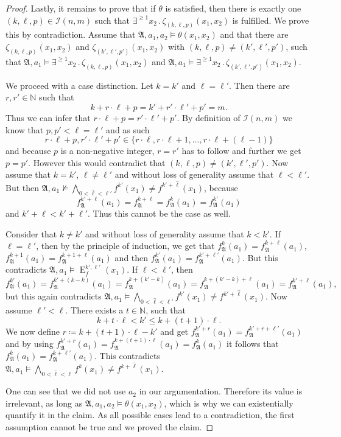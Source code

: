 \begin{proof}
	Lastly, it remains to prove that if $\theta$ is satisfied, then there is exactly one $(k,\ell,p)\in\mathcal{I}(n,m)$ such that $\exists^{\geq 1}x_2\operatorname{.}\zeta_{(k,\ell,p)}(x_1, x_2)$ is fulfilled.
	We prove this by contradiction.
	Assume that $\mathfrak A,a_1,a_2\models \theta(x_1,x_2)$ and that there are $\zeta_{(k,\ell,p)}(x_1,x_2)$ and $\zeta_{(k',\ell',p')}(x_1,x_2)$ with $(k,\ell,p)\neq (k',\ell',p')$, such that $\mathfrak A,a_1\models \exists^{\geq 1}x_2\operatorname{.}\zeta_{(k,\ell,p)}(x_1,x_2)$ and $\mathfrak A,a_1\models \exists^{\geq 1}x_2\operatorname{.}\zeta_{(k',\ell',p')}(x_1,x_2)$.
	
	We proceed with a case distinction. 
	Let $k=k'$ and $\ell=\ell'$.
	Then there are $r,r'\in\mathbb N$ such that
	$$k+r\cdot \ell + p = k'+r'\cdot \ell' + p'=m.$$
	Thus we can infer that $r\cdot \ell+p = r'\cdot \ell'+p'$.
	By definition of $\mathcal{I}(n,m)$ we know that $p,p'<\ell=\ell'$ and as such 
	$$r\cdot \ell +p,r'\cdot \ell'+p'\in \{r\cdot \ell,r\cdot \ell +1,\dots, r\cdot \ell +(\ell-1)\}$$
	and because $p$ is a non-negative integer, $r=r'$ has to follow and further we get $p=p'$.
	However this would contradict that $(k,\ell,p)\neq (k',\ell',p')$.
	Now assume that $k=k'$, $\ell\neq\ell'$ and without loss of generality assume that $\ell<\ell'$.
	But then $\mathfrak A,a_1 \not\models \bigwedge_{0<\hat{\ell}<\ell'}f^{k'}(x_1)\neq f^{k'+\hat{\ell}}(x_1)$, because 
	$$f^{k'+\ell}_{\mathfrak A}(a_1)=f^{k+\ell}_{\mathfrak A}=f^k_{\mathfrak A}(a_1)=f^{k'}_{\mathfrak A}(a_1)$$
	and $k'+\ell < k'+\ell'$.
	Thus this cannot be the case as well.
	
	Consider that $k\neq k'$ and without loss of generality assume that $k<k'$.
	If $\ell=\ell'$, then by the principle of induction, we get that $f_{\mathfrak A}^k(a_1)=f_{\mathfrak A}^{k+\ell}(a_1)$, $f_{\mathfrak A}^{k+1}(a_1)=f_{\mathfrak A}^{k+1+\ell}(a_1)$ and then $f_{\mathfrak A}^{k'}(a_1)=f_{\mathfrak A}^{k'+\ell'}(a_1)$.
	But this contradicts $\mathfrak A,a_1 \models \operatorname{E}^{k',\ell'}_f(x_1)$.
	If $\ell < \ell'$, then 
	$$f_{\mathfrak A}^{k'}(a_1) =f_{\mathfrak A}^{k'+(k-k)}(a_1)=f_{\mathfrak A}^{k+(k'-k)}(a_1)=f_{\mathfrak A}^{k+(k'-k)+\ell}(a_1) = f_{\mathfrak A}^{k'+\ell}(a_1),$$
	but this again contradicts $\mathfrak A,a_1 \models \bigwedge_{0<\hat{\ell}<\ell'}f^{k'}(x_1)\neq f^{k'+\hat{\ell}}(x_1)$.
	Now assume $\ell'<\ell$.
	There exists a $t\in\mathbb N$, such that 
	$$k+t\cdot  \ell < k' \leq k+(t+1)\cdot \ell.$$
	We now define $r\coloneqq k+(t+1)\cdot \ell -k'$ and get $f_{\mathfrak A}^{k'+r}(a_1)=f_{\mathfrak A}^{k'+r+\ell'}(a_1)$ and by using $f_{\mathfrak A}^{k'+r}(a_1)=f_{\mathfrak A}^{k+(t+1)\cdot \ell}(a_1)=f_{\mathfrak A}^k(a_1)$ it follows that $f_{\mathfrak A}^{k}(a_1)=f_{\mathfrak A}^{k+\ell'}(a_1)$.
	This contradicts $\mathfrak A,a_1 \models \bigwedge_{0<\hat{\ell}<\ell}f^{k}(x_1)\neq f^{k+\hat{\ell}}(x_1)$.
	
	One can see that we did not use $a_2$ in our argumentation.
	Therefore its value is irrelevant, as long as $\mathfrak A,a_1,a_2\models \theta(x_1,x_2)$, which is why we can existentially quantify it in the claim.
	As all possible cases lead to a contradiction, the first assumption cannot be true and we proved the claim.
\end{proof}

